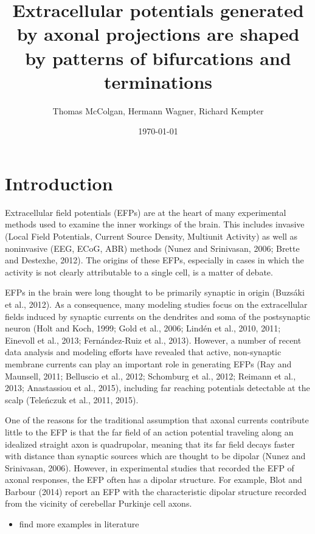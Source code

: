\documentclass[]{article}
\title{Extracellular potentials generated by axonal projections are shaped by
patterns of bifurcations and terminations}
\author{Thomas McColgan, Hermann Wagner, Richard Kempter}
\date{\today}
\begin{document}
\maketitle

\section{Introduction}\label{introduction}

Extracellular field potentials (EFPs) are at the heart of many
experimental methods used to examine the inner workings of the brain.
This includes invasive (Local Field Potentials, Current Source Density,
Multiunit Activity) as well as noninvasive (EEG, ECoG, ABR) methods
(Nunez and Srinivasan, 2006; Brette and Destexhe, 2012). The origins of
these EFPs, especially in cases in which the activity is not clearly
attributable to a single cell, is a matter of debate.

EFPs in the brain were long thought to be primarily synaptic in origin
(Buzsáki et al., 2012). As a consequence, many modeling studies focus on
the extracellular fields induced by synaptic currents on the dendrites
and soma of the postsynaptic neuron (Holt and Koch, 1999; Gold et al.,
2006; Lindén et al., 2010, 2011; Einevoll et al., 2013; Fernández-Ruiz
et al., 2013). However, a number of recent data analysis and modeling
efforts have revealed that active, non-synaptic membrane currents can
play an important role in generating EFPs (Ray and Maunsell, 2011;
Belluscio et al., 2012; Schomburg et al., 2012; Reimann et al., 2013;
Anastassiou et al., 2015), including far reaching potentials detectable
at the scalp (Teleńczuk et al., 2011, 2015).

One of the reasons for the traditional assumption that axonal currents
contribute little to the EFP is that the far field of an action
potential traveling along an idealized straight axon is quadrupolar,
meaning that its far field decays faster with distance than synaptic
sources which are thought to be dipolar (Nunez and Srinivasan, 2006).
However, in experimental studies that recorded the EFP of axonal
responses, the EFP often has a dipolar structure. For example, Blot and
Barbour (2014) report an EFP with the characteristic dipolar structure
recorded from the vicinity of cerebellar Purkinje cell axons.

\begin{itemize}
\itemsep1pt\parskip0pt
\item
  find more examples in literature
\end{itemize}
\end{document}
